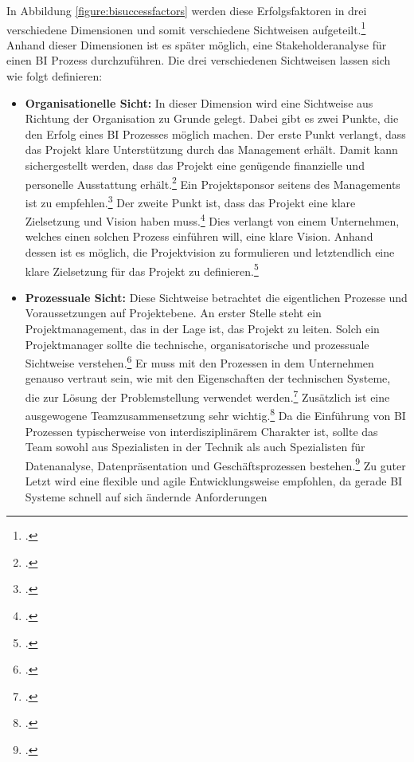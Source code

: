In Abbildung \ref{figure:bisuccessfactors} werden diese Erfolgsfaktoren in drei verschiedene Dimensionen und somit verschiedene
Sichtweisen aufgeteilt.\footcite[Cf.][p. 26ff]{yeoh2010critical} Anhand dieser Dimensionen ist es später möglich, eine
Stakeholderanalyse für einen \ac{BI} Prozess durchzuführen. Die drei verschiedenen Sichtweisen lassen sich wie folgt definieren:

\begin{itemize}
    \item \textbf{Organisationelle Sicht: }In dieser Dimension wird eine Sichtweise aus Richtung der Organisation zu Grunde gelegt.
    Dabei gibt es zwei Punkte, die den Erfolg eines \ac{BI} Prozesses möglich machen. Der erste Punkt verlangt, dass das Projekt
    klare Unterstützung durch das Management erhält. Damit kann sichergestellt werden, dass das Projekt eine genügende finanzielle
    und personelle Ausstattung erhält.\footcite[Cf.][p. 98]{watson2007current} Ein Projektsponsor seitens des Managements ist
    zu empfehlen.\footcite[Cf.][p. 87f]{yeoh2008managing} Der zweite Punkt ist, dass das Projekt eine klare Zielsetzung und Vision
    haben muss.\footcite[Cf.][p. 50]{villamarin2017key} Dies verlangt von einem Unternehmen, welches einen solchen Prozess einführen
    will, eine klare Vision. Anhand dessen ist es möglich, die Projektvision zu formulieren und letztendlich eine klare
    Zielsetzung für das Projekt zu definieren.\footcite[Cf.][p. 87f]{yeoh2008managing}
    \item \textbf{Prozessuale Sicht: }Diese Sichtweise betrachtet die eigentlichen Prozesse und Voraussetzungen auf Projektebene.
    An erster Stelle steht ein Projektmanagement, das in der Lage ist, das Projekt zu leiten. Solch ein Projektmanager sollte die
    technische, organisatorische und prozessuale Sichtweise verstehen.\footcite[Cf.][p. 27]{yeoh2010critical} Er muss mit den
    Prozessen in dem Unternehmen genauso vertraut sein, wie mit den Eigenschaften der technischen Systeme, die zur Lösung der
    Problemstellung verwendet werden.\footcite[Cf.][p. 88f]{yeoh2008managing} Zusätzlich ist eine ausgewogene Teamzusammensetzung
    sehr wichtig.\footcite[Cf.][p. 87f]{yeoh2008managing} Da die Einführung von BI Prozessen typischerweise von
    interdisziplinärem Charakter ist, sollte das Team sowohl aus Spezialisten in der Technik als auch Spezialisten für
    Datenanalyse, Datenpräsentation und Geschäftsprozessen bestehen.\footcite[Cf.][Fig. 7]{muntean2013agile} Zu guter Letzt
    wird eine flexible und agile Entwicklungsweise empfohlen, da gerade \ac{BI} Systeme schnell auf sich ändernde Anforderungen

\end{itemize}

